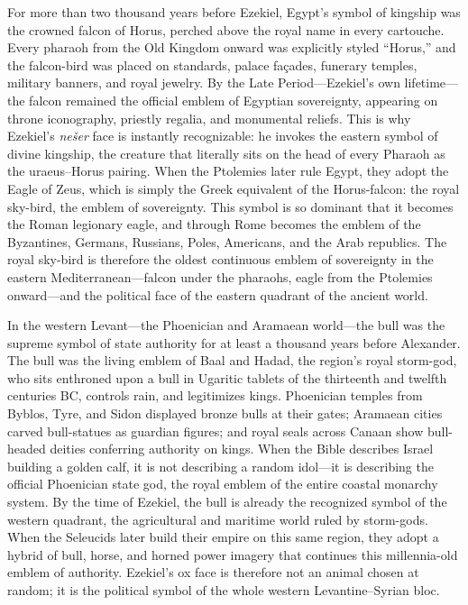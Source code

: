For more than two thousand years before Ezekiel, Egypt's symbol of kingship was the crowned falcon of Horus, perched above the royal name in every cartouche.
Every pharaoh from the Old Kingdom onward was explicitly styled ``Horus,'' and the falcon-bird was placed on standards, palace façades, funerary temples, military banners, and royal jewelry.
By the Late Period---Ezekiel's own lifetime---the falcon remained the official emblem of Egyptian sovereignty, appearing on throne iconography, priestly regalia, and monumental reliefs.
This is why Ezekiel's \emph{nešer} face is instantly recognizable: he invokes the eastern symbol of divine kingship, the creature that literally sits on the head of every Pharaoh as the uraeus--Horus pairing.
When the Ptolemies later rule Egypt, they adopt the Eagle of Zeus, which is simply the Greek equivalent of the Horus-falcon: the royal sky-bird, the emblem of sovereignty.
This symbol is so dominant that it becomes the Roman legionary eagle, and through Rome becomes the emblem of the Byzantines, Germans, Russians, Poles, Americans, and the Arab republics.
The royal sky-bird is therefore the oldest continuous emblem of sovereignty in the eastern Mediterranean---falcon under the pharaohs, eagle from the Ptolemies onward---and the political face of the eastern quadrant of the ancient world.

In the western Levant---the Phoenician and Aramaean world---the bull was the supreme symbol of state authority for at least a thousand years before Alexander.
The bull was the living emblem of Baal and Hadad, the region's royal storm-god, who sits enthroned upon a bull in Ugaritic tablets of the thirteenth and twelfth centuries BC, controls rain, and legitimizes kings.
Phoenician temples from Byblos, Tyre, and Sidon displayed bronze bulls at their gates; Aramaean cities carved bull-statues as guardian figures; and royal seals across Canaan show bull-headed deities conferring authority on kings.
When the Bible describes Israel building a golden calf, it is not describing a random idol---it is describing the official Phoenician state god, the royal emblem of the entire coastal monarchy system.
By the time of Ezekiel, the bull is already the recognized symbol of the western quadrant, the agricultural and maritime world ruled by storm-gods.
When the Seleucids later build their empire on this same region, they adopt a hybrid of bull, horse, and horned power imagery that continues this millennia-old emblem of authority.
Ezekiel's ox face is therefore not an animal chosen at random; it is the political symbol of the whole western Levantine--Syrian bloc.

